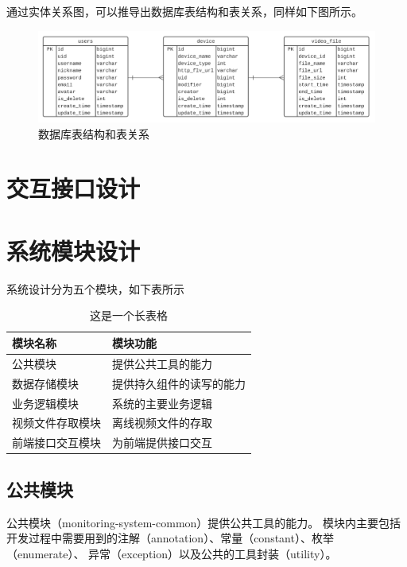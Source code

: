 通过实体关系图，可以推导出数据库表结构和表关系，同样如下图所示。

\begin{figure}[ht]
    \centering
    \includegraphics[width=0.5\linewidth]{./Figure/IMG_db.png}
    \caption{数据库表结构和表关系}\label{Fig:db}
\end{figure}

\section{交互接口设计}

\section{系统模块设计}
系统设计分为五个模块，如下表所示


\begin{longtable}[c]{C{5cm}C{7cm}}
    \caption{这是一个长表格}\label{Tab:longtable}\\
    \hline
    模块名称 & 模块功能\\

    \hline
    公共模块&提供公共工具的能力\\ %
    \hline
    数据存储模块&提供持久组件的读写的能力\\ %
    \hline
    业务逻辑模块&系统的主要业务逻辑\\ %
    \hline
    视频文件存取模块&离线视频文件的存取\\ %
    \hline
    前端接口交互模块&为前端提供接口交互\\ %
    \hline
\end{longtable}
\subsection{公共模块}
公共模块（monitoring-system-common）提供公共工具的能力。
模块内主要包括开发过程中需要用到的注解（annotation）、常量（constant）、枚举（enumerate）、
异常（exception）以及公共的工具封装（utility）。

